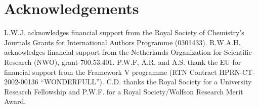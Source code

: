 \section*{Acknowledgements}
L.W.J. acknowledges financial support from the Royal Society of Chemistry's Journals Grants for International Authors Programme (0301433).
R.W.A.H. acknowledges financial support from the Netherlands Organization for Scientific Research (NWO), grant 700.53.401. P.W.F, A.R. and
A.S. thank the EU for financial support from the Framework V programme (RTN Contract HPRN-CT-2002-00136 ``WONDERFULL'').
C.D. thanks the Royal Society for a University Research Fellowship and P.W.F. for a Royal Society/Wolfson Research Merit Award.



